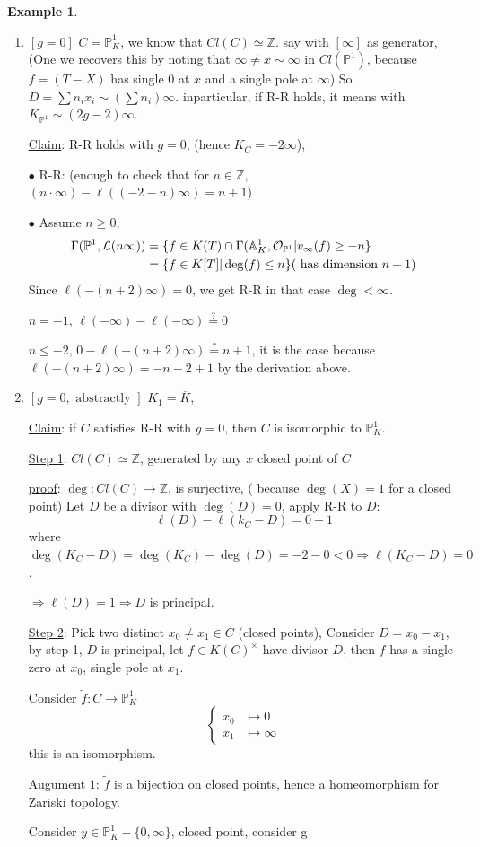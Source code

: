 \documentclass[11pt]{article}
\theoremstyle{definition}
\newtheorem{ex}[thm]{Example}
\newcommand{\affn}{\mathbb A}
\newcommand{\proj}{\mathbb P}
\newcommand{\intg}{\mathbb Z}
\newcommand{\call}{{\cal L}}
\newcommand{\calo}{{\cal O}}
\newcommand{\Lrta}{\Longrightarrow}
\newcommand{\lrta}{\longrightarrow}
\begin{document}
 \begin{ex}\ 
 \begin{enumerate}[label=(\arabic*)]
\item $[g=0]$ $C=\proj^1_K$, we know that $Cl(C)\simeq  \intg$. say with $[\infty]$ as generator, (One we recovers this by noting that $\infty \neq x\sim \infty$ in $Cl(\proj^1)$, because $f=(T-X)$ has single $0$ at $x$ and a single pole at $\infty$)
So $D=\sum n_i x_i\sim (\sum n_i)\infty$.  inparticular, if R-R holds, it means with $K_{\proj^1}\sim (2g-2)\infty$.

\underline{Claim}: R-R holds with $g=0$, (hence $K_C=-2\infty$),

$\bullet$ R-R: (enough to check that for $n\in \intg$, $(n\cdot \infty)-\ell((-2-n)\infty)=n+1$)

$\bullet$ Assume $n\geq 0$,
$$
\begin{aligned}
\Gamma(\proj^1,\call(n\infty))&=\{f\in K(T)\cap \Gamma(\affn^1_K,\calo_{\proj^1}|v_{\infty}(f)\geq -n\}\\
&=\{f\in K[T]|\deg(f)\leq n\} (\text{ has dimension $n+1$})
\end{aligned}
$$
Since $\ell(-(n+2)\infty)=0$, we get R-R in that case $\deg< \infty$.

$n=-1$, $\ell(-\infty)-\ell(-\infty)\overset{?}{=}0$

$n\leq -2$, $0-\ell(-(n+2)\infty)\overset{?}{=}n+1$, it is the case because $\ell(-(n+2)\infty)=-n-2+1$ by the derivation above.
\item $[g=0,\text{ abstractly }]$ $K_1=\overline{K}$, 

\underline{Claim}: if $C$ satisfies R-R with $g=0$, then $C$ is isomorphic to $\proj^1_K$.

\underline{Step 1}: $Cl(C)\simeq \intg$, generated by any $x$ closed point of $C$

\underline{proof}: $\deg: Cl(C)\lrta \intg$, is surjective, ( because $\deg(X)=1$ for a closed point) Let $D$ be a divisor with $\deg(D)=0$, apply R-R
 to $D$:
 $$
\ell(D)-\ell(k_C-D)=0+1
 $$
 where $\deg(K_C-D)=\deg(K_C)-\deg(D)=-2-0< 0\Lrta \ell(K_C-D)=0$.

 $\Lrta \ell(D)=1\Lrta D$ is principal.

 \underline{Step 2}: Pick two distinct $x_0\neq x_1\in C$ (closed points), Consider $D=x_0-x_1$, by step 1, $D$ is principal, let $f\in K(C)^\times$ have divisor $D$, then $f$ has a single zero at $x_0$, single pole at $x_1$.

Consider $\tilde{f}: C\lrta \proj^1_K$
$$
\left\{
\begin{aligned}
x_0&\longmapsto 0\\
x_1&\longmapsto \infty
\end{aligned}
\right.
$$
this is an isomorphism.

Augument $1$: $\tilde{f}$ is a bijection on closed points, hence a  homeomorphism for Zariski topology.

Consider $y\in \proj^1_K-\{0,\infty\}$, closed point, consider g

 \end{enumerate}
 \end{ex}
\end{document}
